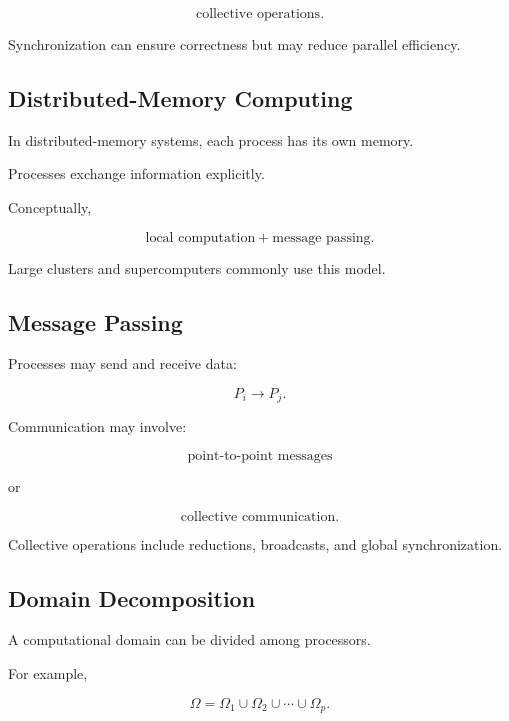 \[
\boxed{
\text{collective operations}.
}
\]

Synchronization can ensure correctness but may reduce parallel efficiency.

\subsection{Distributed-Memory Computing}
\label{subsec:distributed-memory}

In distributed-memory systems, each process has its own memory.

Processes exchange information explicitly.

Conceptually,

\[
\boxed{
\text{local computation}
+
\text{message passing}.
}
\]

Large clusters and supercomputers commonly use this model.

\subsection{Message Passing}
\label{subsec:message-passing}

Processes may send and receive data:

\[
\boxed{
P_i
\longrightarrow
P_j.
}
\]

Communication may involve:

\[
\boxed{
\text{point-to-point messages}
}
\]

or

\[
\boxed{
\text{collective communication}.
}
\]

Collective operations include reductions, broadcasts, and global
synchronization.

\subsection{Domain Decomposition}
\label{subsec:scientific-domain-decomposition}

A computational domain can be divided among processors.

For example,

\[
\boxed{
\Omega
=
\Omega_1
\cup
\Omega_2
\cup
\cdots
\cup
\Omega_p.
}
\]

